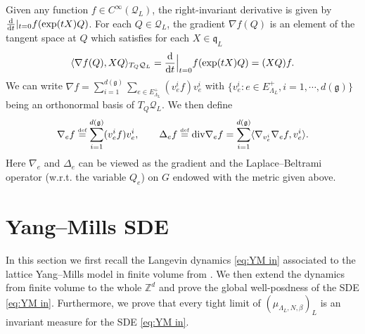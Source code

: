 \documentclass[11pt,UTF-8,reqno]{amsart}
\numberwithin{equation}{section}
\def\<{{\langle}}
\def\>{{\rangle}}
\def\dif{{\mathord{{\rm d}}}}
\newcommand{\eqdef}{\stackrel{\mbox{\tiny def}}{=}}
\def\cQ{{\mathcal Q}}
\def\mZ{{\mathbb Z}}
\def\q{\mathfrak{q}}
\def\div{\mathord{{\rm div}}}
\def\<{{\langle}}
\def\>{{\rangle}}
\def\dif{{\mathord{{\rm d}}}}
\def\mfg{\mathfrak{g}}
\def\div{\mathord{{\rm div}}}
\def\dg{d(\mfg)}
\def\<{\langle} \def\>{\rangle}
\begin{document}
Given any function $f \in C^{\infty}(\mathcal{Q}_L)$, the right-invariant derivative is given by $\frac{\dif}{\dif t}|_{t=0} f(\text{exp}(tX)  Q)$.  For each $Q \in \mathcal{Q}_L$, the gradient $\nabla f(Q)$ is an element of the tangent space at $Q$ which satisfies for each $X \in \q_L$
\begin{equation}
	\langle \nabla f(Q),  XQ \rangle_{T_Q\cQ_L} = \frac{\dif}{\dif t}\Big|_{t=0} f(\text{exp}(tX)  Q)=(XQ)f.
\end{equation}
We can write $\nabla f=\sum_{i=1}^{\dg}\sum_{e\in E_{\Lambda_L}^+}(v^i_ef)v^i_e$
with $\{v^i_e : e\in E_{\Lambda_L}^+, i=1,\cdots, \dg\}$ being an orthonormal basis of $T_Q\cQ_L$.
We then define
\begin{align*}
	\nabla_{e}f\eqdef \sum_{i=1}^{\dg}(v_e^if)v_e^i,
	\qquad
	\Delta_ef\eqdef  \div\nabla_ef=\sum_{i=1}^{\dg}\<\nabla_{v_e^i}\nabla_{e}f,v_e^i\>.
\end{align*}
Here $\nabla_{e}$ and $\Delta_{e}$ can be viewed as  the gradient and the  Laplace--Beltrami operator (w.r.t. the variable $Q_e$) on
$G$ endowed with the metric given above.  %









\section{Yang--Mills SDE}\label{sec:3.1}
In this section we first recall the Langevin dynamics \eqref{eq:YM in} associated to the lattice Yang--Mills model in finite volume from \cite{SSZloop}. 
We then extend the dynamics from finite volume to the whole $\mZ^d$  and prove the global well-posdness of the SDE \eqref{eq:YM in}. Furthermore, we prove that every tight limit of $(\mu_{\Lambda_L,N,\beta})_L$ is an invariant measure for the SDE \eqref{eq:YM in}.
\end{document}
